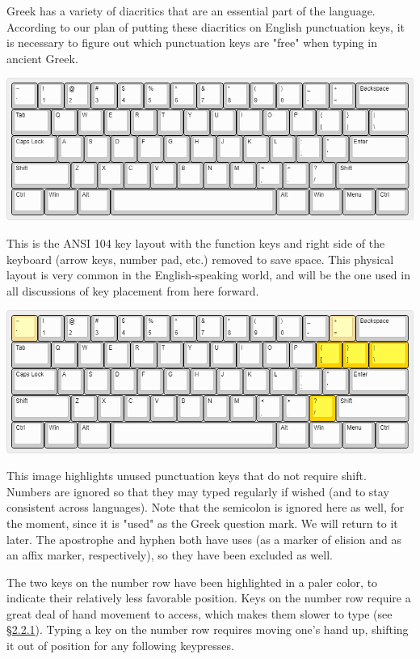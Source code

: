\documentclass[11pt]{article}
\begin{document}
Greek has a variety of diacritics that are an essential part of the language. According to our plan of putting these diacritics on English punctuation keys, it is necessary to figure out which punctuation keys are "free" when typing in ancient Greek.

\begin{center}
\includegraphics[width=.9\linewidth]{./images/base.png}
\end{center}

This is the ANSI 104 key layout with the function keys and right side of the keyboard (arrow keys, number pad, etc.) removed to save space. This physical layout is very common in the English-speaking world, and will be the one used in all discussions of key placement from here forward.

\begin{center}
\includegraphics[width=.9\linewidth]{./images/unused-no-shift.png}
\end{center}

This image highlights unused punctuation keys that do not require shift. Numbers are ignored so that they may typed regularly if wished (and to stay consistent across languages). Note that the semicolon is ignored here as well, for the moment, since it is "used" as the Greek question mark. We will return to it later. The apostrophe and hyphen both have uses (as a marker of elision and as an affix marker, respectively), so they have been excluded as well.

The two keys on the number row have been highlighted in a paler color, to indicate their relatively less favorable position. Keys on the number row require a great deal of hand movement to access, which makes them slower to type (see \hyperref[sec:org02f3267]{§2.2.1}). Typing a key on the number row requires moving one's hand up, shifting it out of position for any following keypresses.
\end{document}
